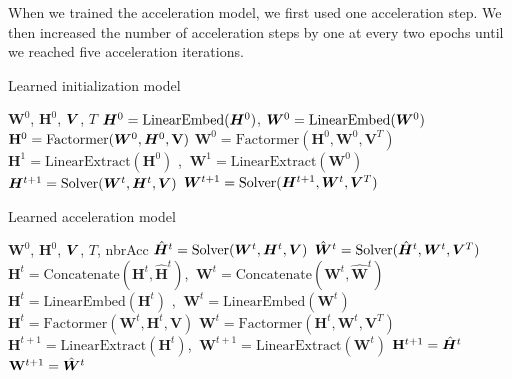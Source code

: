 \documentclass{article}
\begin{document}
When we trained the acceleration model, we first used one acceleration step. We then increased the number of acceleration steps by one at every two epochs until we reached five acceleration iterations. 
\begin{algorithm}[ht]
   \caption{Learned initialization model}
   \label{alg:init_net}
\begin{algorithmic}
    $\mathbf{W}^0$, $\mathbf{H}^0$, ${\bm{V}}$, $T$ 
   \STATE ${\bm{H}}^0 = \text{LinearEmbed}({\bm{H}}^0)$, ${\bm{W}}^0 = \text{LinearEmbed}({\bm{W}}^0)$  \hfill{}
      \STATE $\mathbf{H}^0 = \text{Factormer}({\bm{W}}^0, {\bm{H}}^0, \mathbf{V})$ 
 \STATE $\mathbf{W}^0 = \text{Factormer}(\mathbf{H}^0, \mathbf{W}^0, \mathbf{V}^T)$ 
   \ENDFOR
    \STATE $\mathbf{H}^1 = \text{LinearExtract}(\mathbf{H}^0)$ ,  $\ \mathbf{W}^1 = \text{LinearExtract}(\mathbf{W}^0)$ \hfill{}
    \STATE ${{\bm{H}}}^{t+1} = \text{Solver}({\bm{W}}^t, {\bm{H}}^t, {\bm{V}})$
   \STATE ${{\bm{W}}}^{t+1} = \text{Solver}({\bm{H}}^{t+1}, {\bm{W}}^t, {\bm{V}}^T)$
   \ENDFOR
\end{algorithmic}
\end{algorithm}
\begin{algorithm}[ht]
   \caption{Learned acceleration model}
   \label{alg:acc_net}
\begin{algorithmic}
    $\mathbf{W}^0$, $\mathbf{H}^0$, ${\bm{V}}$, $T$, nbrAcc \hfill{}
    \STATE $\hat{{\bm{H}}}^t = \text{Solver}({\bm{W}}^t, {\bm{H}}^t, {\bm{V}})$
   \STATE $\hat{{\bm{W}}}^t = \text{Solver}(\hat{{\bm{H}}}^t, {\bm{W}}^t, {\bm{V}}^T)$
   \STATE $\mathbf{H}^t = \text{Concatenate}(\mathbf{H}^t, \widehat{\mathbf{H}}^t)$, $ \ \mathbf{W}^t = \text{Concatenate}(\mathbf{W}^t, \hat{\mathbf{W}}^t)$
   \STATE $\mathbf{H}^t = \text{LinearEmbed}(\mathbf{H}^t)$ , $\ \mathbf{W}^t = \text{LinearEmbed}(\mathbf{W}^t)$ \hfill{}
   \STATE $\mathbf{H}^t = \text{Factormer}(\mathbf{W}^t, \mathbf{H}^t,\mathbf{V})$ 
   \STATE $\mathbf{W}^t = \text{Factormer}(\mathbf{H}^t, \mathbf{W}^t, \mathbf{V}^T)$ 
   \ENDFOR
    \STATE $\mathbf{H}^{t+1} = \text{LinearExtract}(\mathbf{H}^t)$, $\ \mathbf{W}^{t+1} = \text{LinearExtract}(\mathbf{W}^t)$   \hfill{}
    \ELSE
    \STATE $\mathbf{H}^{t+1} = \hat{{\bm{H}}}^t$
    \STATE $\mathbf{W}^{t+1} = \hat{{\bm{W}}}^t$
    \ENDIF
    \ENDFOR
\end{algorithmic}
\end{algorithm}
\end{document}
